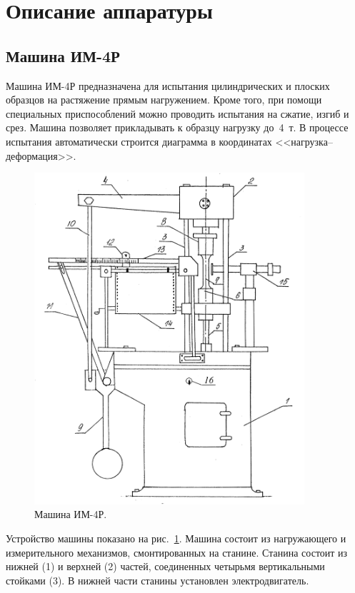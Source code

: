 \documentclass[12pt, a4paper]{article}
\begin{document}
    \section{Описание аппаратуры}
    
    \subsection{Машина ИМ-4Р}
    
    Машина ИМ-4Р предназначена для испытания цилиндрических и плоских образцов на растяжение прямым нагружением. Кроме того, при помощи специальных приспособлений можно проводить испытания на сжатие, изгиб и срез. Машина позволяет прикладывать к образцу нагрузку до 4~т. В процессе испытания автоматически строится диаграмма в координатах <<нагрузка–деформация>>.
    
    \begin{figure}[h]
        \centering
        \includegraphics[width = 10cm]{image_1.png}
        \caption{Машина ИМ-4Р.}
        \label{im1}
    \end{figure}
    
    Устройство машины показано на рис.~\ref{im1}. Машина состоит из нагружающего и измерительного механизмов, смонтированных на станине. Станина состоит из нижней (1) и верхней (2) частей, соединенных четырьмя вертикальными стойками (3). В нижней части станины установлен электродвигатель.
    
\end{document}
